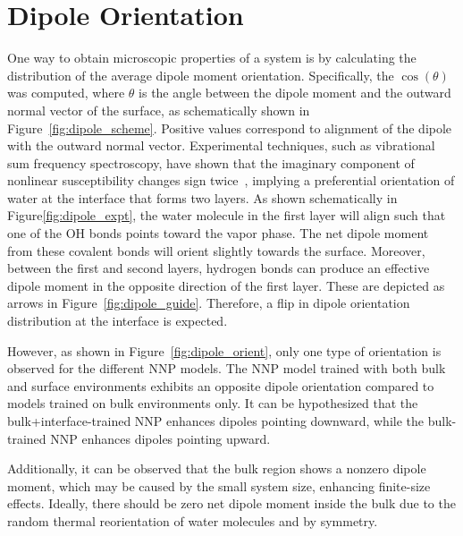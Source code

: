 \section{Dipole Orientation}

One way to obtain microscopic properties of a system is by calculating the distribution of the average dipole moment orientation. Specifically, the $\cos(\theta)$ was computed, where $\theta$ is the angle between the dipole moment and the outward normal vector of the surface, as schematically shown in Figure~\ref{fig:dipole_scheme}. Positive values correspond to alignment of the dipole with the outward normal vector. Experimental techniques, such as vibrational sum frequency spectroscopy, have shown that the imaginary component of nonlinear susceptibility changes sign twice~\cite{fan2009structure}, implying a preferential orientation of water at the interface that forms two layers. As shown schematically in Figure\ref{fig:dipole_expt}, the water molecule in the first layer will align such that one of the OH bonds points toward the vapor phase. The net dipole moment from these covalent bonds will orient slightly towards the surface. Moreover, between the first and second layers, hydrogen bonds can produce an effective dipole moment in the opposite direction of the first layer. These are depicted as arrows in Figure~\ref{fig:dipole_guide}. Therefore, a flip in dipole orientation distribution at the interface is expected.

However, as shown in Figure~\ref{fig:dipole_orient}, only one type of orientation is observed for the different NNP models. The NNP model trained with both bulk and surface environments exhibits an opposite dipole orientation compared to models trained on bulk environments only. It can be hypothesized that the bulk+interface-trained NNP enhances dipoles pointing downward, while the bulk-trained NNP enhances dipoles pointing upward.

Additionally, it can be observed that the bulk region shows a nonzero dipole moment, which may be caused by the small system size, enhancing finite-size effects. Ideally, there should be zero net dipole moment inside the bulk due to the random thermal reorientation of water molecules and by symmetry.



